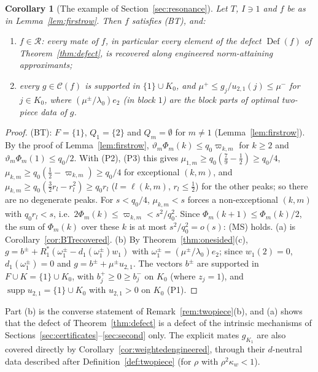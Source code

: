 \documentclass[10pt]{amsart}
\newtheorem{corollary}[theorem]{Corollary}
\theoremstyle{definition}
\theoremstyle{remark}
\newcommand{\supp}{\operatorname{supp}}
\newcommand{\Cset}{\mathcal C}
\newcommand{\Def}{\operatorname{Def}}
\newcommand{\Rec}{\mathcal R}
\begin{document}
\begin{corollary}[The example of Section~\ref{sec:resonance}]\label{cor:exampleRecovered}
Let $T$, $I\ni1$ and $f$ be as in Lemma~\ref{lem:firstrow}.  Then $f$
satisfies \textup{(BT)}, and:
\begin{enumerate}
\item[(a)] $f\in\Rec$: every mate of $f$, in particular every element of the
defect $\Def(f)$ of Theorem~\ref{thm:defect}, is recovered along engineered
norm-attaining approximants;
\item[(b)] every $g\in\Cset(f)$ is supported in $\{1\}\cup K_0$, and
$\mu^+\le g_j/u_{2,1}(j)\le\mu^-$ for $j\in K_0$, where
$(\mu^\pm/\lambda_0)e_2$ \textup{(}in block $1$\textup{)} are the block parts
of optimal two-piece data of $g$.
\end{enumerate}
\end{corollary}

\begin{proof}
\textup{(BT)}: $F=\{1\}$, $Q_1=\{2\}$ and $Q_m=\emptyset$ for $m\ne1$
(Lemma~\ref{lem:firstrow}).  By the proof of Lemma~\ref{lem:firstrow},
$\vartheta_m\Phi_m(k)\le q_0\varpi_{k,m}$ for $k\ge2$ and
$\vartheta_m\Phi_m(1)\le q_0/2$.  With (P2), (P3) this gives
$\mu_{1,m}\ge q_0(\frac79-\frac12)\ge q_0/4$, $\mu_{k,m}\ge q_0(\frac12-
\varpi_{k,m})\ge q_0/4$ for exceptional $(k,m)$, and $\mu_{k,m}\ge
q_0(\frac32r_l-r_l^2)\ge q_0r_l$ ($l=\ell(k,m)$, $r_l\le\frac12$) for the
other peaks; so there are no degenerate peaks.  For $s<q_0/4$,
$\mu_{k,m}<s$ forces a non-exceptional $(k,m)$ with $q_0r_l<s$, i.e.\
$2\Phi_m(k)\le\varpi_{k,m}<s^2/q_0^2$.  Since $\Phi_m(k+1)\le\Phi_m(k)/2$, the
sum of $\Phi_m(k)$ over these $k$ is at most $s^2/q_0^2=o(s)$: \textup{(MS)}
holds.  (a) is Corollary~\ref{cor:BTrecovered}.  (b) By
Theorem~\ref{thm:onesided}(c), $g=b^\pm+R_1^*(\omega^\pm_1-d_1(\omega^\pm_1)
w_1)$ with $\omega^\pm_1=(\mu^\pm/\lambda_0)e_2$; since $w_1(2)=0$,
$d_1(\omega^\pm_1)=0$ and $g=b^\pm+\mu^\pm u_{2,1}$.  The vectors $b^\pm$ are
supported in $F\cup K=\{1\}\cup K_0$, with $b^+_j\ge0\ge b^-_j$ on $K_0$
(where $z_j=1$), and $\supp u_{2,1}=\{1\}\cup K_0$ with $u_{2,1}>0$ on $K_0$
(P1).
\end{proof}

Part (b) is the converse statement of Remark~\ref{rem:twopiece}(b), and
(a) shows that the defect of Theorem~\ref{thm:defect} is a defect of the
intrinsic mechanisms of Sections~\ref{sec:certificates}--\ref{sec:second}
only.  The explicit mates $g_{K_1}$ are also covered directly by
Corollary~\ref{cor:weightedengineered}, through their $d$-neutral data
described after Definition~\ref{def:twopiece} (for $\rho$ with
$\rho^2\kappa_w<1$).
\end{document}
